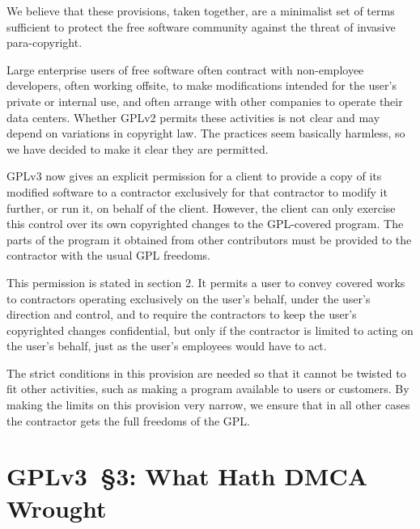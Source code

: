 We believe that these provisions, taken together, are a minimalist set of
terms sufficient to protect the free software community against the threat of
invasive para-copyright.

Large enterprise users of free software often contract with non-employee
developers, often working offsite, to make modifications intended for
the user's private or internal use, and often arrange with other
companies to operate their data centers.  Whether GPLv2 permits these
activities is not clear and may depend on variations in copyright law.
The practices seem basically harmless, so we have decided to make it
clear they are permitted.

GPLv3 now gives an explicit permission for a client to provide a copy of
its modified software to a contractor exclusively for that contractor to
modify it further, or run it, on behalf of the client.  However, the
client can only exercise this control over its own copyrighted changes
to the GPL-covered program.  The parts of the program it obtained from
other contributors must be provided to the contractor with the usual GPL
freedoms.

This permission is stated in section 2.  It permits a user to convey
covered works to contractors operating exclusively on the user's behalf,
under the user's direction and control, and to require the contractors
to keep the user's copyrighted changes confidential, but only if the
contractor is limited to acting on the user's behalf, just as the user's
employees would have to act.

The strict conditions in this provision are needed so that it cannot be
twisted to fit other activities, such as making a program available to
users or customers.  By making the limits on this provision very narrow,
we ensure that in all other cases the contractor gets the full freedoms
of the GPL.

\section{GPLv3~\S3: What Hath DMCA Wrought}
\label{GPLv3s3}



